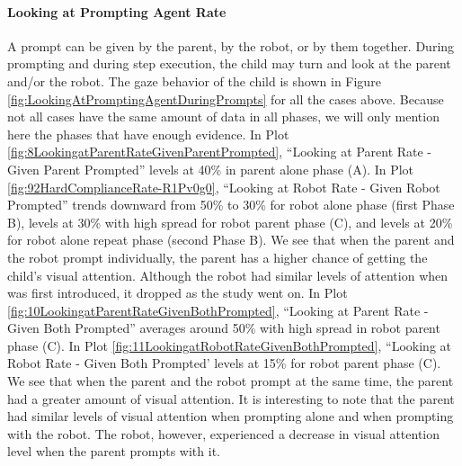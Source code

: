 \paragraph{Looking at Prompting Agent Rate}
A prompt can be given by the parent, by the robot, or by them together.  During prompting and during step execution, the child may turn and look at the parent and/or the robot.  The gaze behavior of the child is shown in Figure \ref{fig:LookingAtPromptingAgentDuringPrompts} for all the cases above.  Because not all cases have the same amount of data in all phases, we will only mention here the phases that have enough evidence.  In Plot \ref{fig:8LookingatParentRateGivenParentPrompted}, ``Looking at Parent Rate - Given Parent Prompted'' levels at 40\% in parent alone phase (A).  In Plot \ref{fig:92HardComplianceRate-R1Pv0g0}, ``Looking at Robot Rate - Given Robot Prompted'' trends downward from 50\% to 30\% for robot alone phase (first Phase B), levels at 30\% with high spread for robot parent phase (C), and levels at 20\% for robot alone repeat phase (second Phase B).  We see that when the parent and the robot prompt individually, the parent has a higher chance of getting the child's visual attention.  Although the robot had similar levels of attention when was first introduced, it dropped as the study went on.  In Plot \ref{fig:10LookingatParentRateGivenBothPrompted}, ``Looking at Parent Rate - Given Both Prompted'' averages around 50\% with high spread in robot parent phase (C).  In Plot \ref{fig:11LookingatRobotRateGivenBothPrompted}, ``Looking at Robot Rate - Given Both Prompted' levels at 15\% for robot parent phase (C).  We see that when the parent and the robot prompt at the same time, the parent had a greater amount of visual attention.  It is interesting to note that the parent had similar levels of visual attention when prompting alone and when prompting with the robot.  The robot, however, experienced a decrease in visual attention level when the parent prompts with it.
